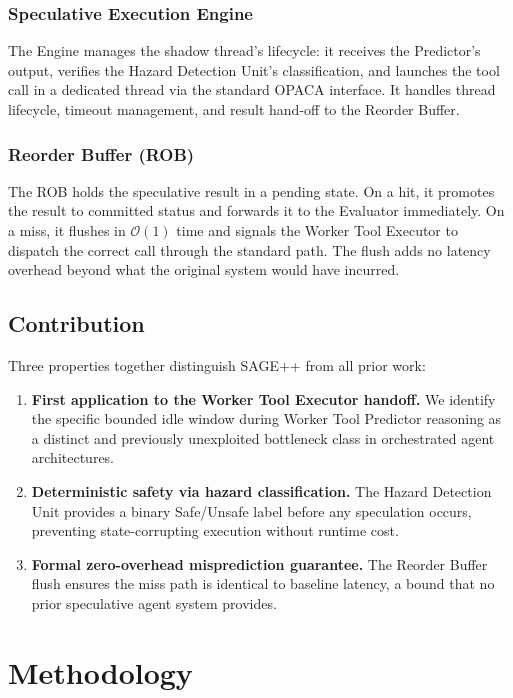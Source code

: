 \documentclass[conference]{IEEEtran}
\begin{document}
\subsubsection{Speculative Execution Engine}
The Engine manages the shadow thread's lifecycle: it receives the Predictor's
output, verifies the Hazard Detection Unit's classification, and launches the
tool call in a dedicated thread via the standard OPACA interface.
It handles thread lifecycle, timeout management, and result hand-off to the
Reorder Buffer.

\subsubsection{Reorder Buffer (ROB)}
The ROB holds the speculative result in a pending state.
On a hit, it promotes the result to committed status and forwards it to the
Evaluator immediately.
On a miss, it flushes in $\mathcal{O}(1)$ time and signals the Worker Tool
Executor to dispatch the correct call through the standard path.
The flush adds no latency overhead beyond what the original system would have
incurred.

\subsection{Contribution}
Three properties together distinguish SAGE++ from all prior work:
\begin{enumerate}[itemsep=3pt]
  \item \textbf{First application to the Worker Tool Executor handoff.}
        We identify the specific bounded idle window during Worker Tool Predictor
        reasoning as a distinct and previously unexploited bottleneck class in
        orchestrated agent architectures.
  \item \textbf{Deterministic safety via hazard classification.}
        The Hazard Detection Unit provides a binary Safe/Unsafe label before any
        speculation occurs, preventing state-corrupting execution without runtime
        cost.
  \item \textbf{Formal zero-overhead misprediction guarantee.}
        The Reorder Buffer flush ensures the miss path is identical to baseline
        latency, a bound that no prior speculative agent system provides.
\end{enumerate}

\section{Methodology}
\end{document}
